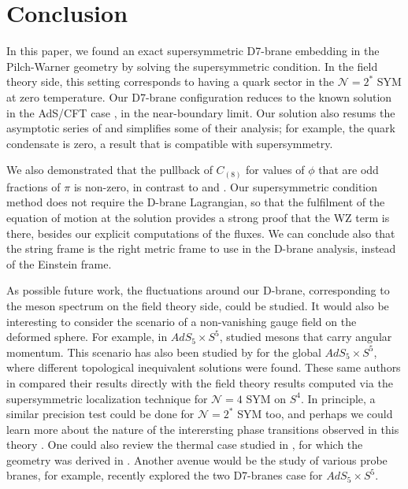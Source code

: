 \section{Conclusion}

In this paper, we found an exact supersymmetric D7-brane embedding in the Pilch-Warner geometry by solving the supersymmetric condition. In the field theory side, this setting corresponds to having a quark sector in the $\mathcal{N}=2^*$ SYM at zero temperature. Our D7-brane configuration reduces to the known solution in the AdS/CFT case \cite{Karch:2005ms}, in the near-boundary limit. Our solution also resums the asymptotic series of \cite{Albash:2011nw} and simplifies some of their analysis; for example, the quark condensate is zero, a result that is compatible with supersymmetry. 

We also demonstrated that the pullback of $C_{(8)}$ for values of $\phi$ that are odd fractions of $\pi$ is non-zero, in contrast to \cite{Albash:2011nw} and \cite{Evans:2005ti}. Our supersymmetric condition method does not require the D-brane Lagrangian, so that the fulfilment of the equation of motion at the solution provides a strong proof that the WZ term is there, besides our explicit computations of the fluxes. We can conclude also that the string frame is the right metric frame to use in the D-brane analysis, instead of the Einstein frame. 

As possible future work, the fluctuations around our D-brane, corresponding to the meson spectrum on the field theory side, could be studied. It would also be interesting to consider the scenario of a non-vanishing gauge field on the deformed sphere. For example, in $AdS_5 \times S^5$, \cite{Kruczenski:2003be} studied mesons that carry angular momentum. This scenario has also been studied by \cite{Karch:2015vra} for the global $AdS_5 \times S^5$, where different topological inequivalent solutions were found. These same authors in \cite{Karch:2015kfa} compared their results directly with the field theory results computed via the supersymmetric localization technique \cite{Pestun:2007rz} for $\mathcal{N}=4$ SYM on $S^4$. In principle, a similar precision test could be done for $\mathcal{N}=2^*$ SYM too, and perhaps we could learn more about the nature of the interersting phase transitions observed in this theory \cite{Russo:2013qaa, Zarembo:2014ooa, Chen:2014vka}. One could also review the thermal case studied in \cite{Albash:2011dq}, for which the geometry was derived in \cite{Buchel:2003ah}. Another avenue would be the study of various probe branes, for example, \cite{Faedo:2019jlp} recently explored the two D7-branes case for $AdS_5 \times S^5$.


